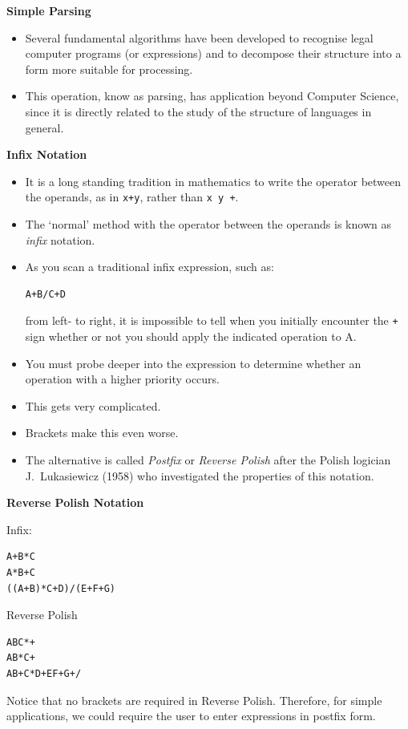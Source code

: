 \newpage
{\samepage
\begin{center}
{\Large{\bf Simple Parsing}}
\end{center}
\begin{itemize}
\item Several fundamental algorithms have been developed
to recognise legal computer programs (or expressions) and to
decompose their structure into a form more suitable for processing.
\item This operation, know as parsing, has application
beyond Computer Science, since it is directly related to the study of
the structure of languages in general.
\end{itemize}
}


\newpage
{\samepage
\begin{center}
{\Large{\bf Infix Notation}}
\end{center}
{\small
\begin{itemize}
\item It is a long standing tradition in mathematics to write the operator
between the operands, as in \verb^x+y^, rather than \verb^x y +^.
\item The `normal' method with the operator between the operands is
known as {\it infix} notation.
\item As you scan a traditional infix expression, such as:
\begin{verbatim}
A+B/C+D
\end{verbatim}
from left- to right, it is impossible to tell when you initially encounter the \verb^+^ sign whether or not you should apply the indicated operation to
A.
\item You must probe deeper into the expression to determine whether an operation with a higher priority occurs.
\item This gets very complicated.
\item Brackets make this even worse.
\item The alternative is called {\it Postfix} or {\it Reverse Polish}
after the Polish logician J.\ Lukasiewicz (1958) who investigated the
properties of this notation.
\end{itemize}
}}

\newpage
{\samepage
\begin{center}
{\Large{\bf Reverse Polish Notation}}
\end{center}

Infix:
\begin{verbatim}
A+B*C
A*B+C
((A+B)*C+D)/(E+F+G)
\end{verbatim}

Reverse Polish
\begin{verbatim}
ABC*+
AB*C+
AB+C*D+EF+G+/
\end{verbatim}

Notice that no brackets are required in Reverse Polish. Therefore,
for simple applications, we could require the user to enter expressions
in postfix form.
}

